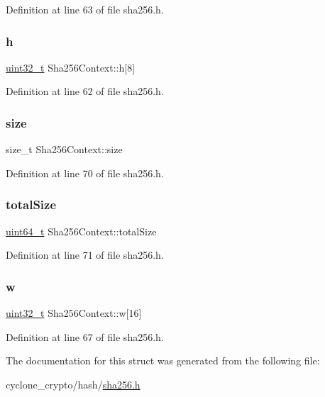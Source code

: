 Definition at line 63 of file sha256.\+h.

\mbox{\label{structSha256Context_a47e82c75a2bffa21e47cd4f7dde0e01d}} 
\subsubsection{\texorpdfstring{h}{h}}
{\footnotesize\ttfamily \hyperlink{stdint_8h_a435d1572bf3f880d55459d9805097f62}{uint32\+\_\+t} Sha256\+Context\+::h\mbox{[}8\mbox{]}}



Definition at line 62 of file sha256.\+h.

\mbox{\label{structSha256Context_aa0dd1c73bffbc7dd5e0a3ca761a2b5a5}} 
\subsubsection{\texorpdfstring{size}{size}}
{\footnotesize\ttfamily size\+\_\+t Sha256\+Context\+::size}



Definition at line 70 of file sha256.\+h.

\mbox{\label{structSha256Context_a1580160baa9a7ab6788054ce71f9e6af}} 
\subsubsection{\texorpdfstring{total\+Size}{totalSize}}
{\footnotesize\ttfamily \hyperlink{stdint_8h_aec6fcb673ff035718c238c8c9d544c47}{uint64\+\_\+t} Sha256\+Context\+::total\+Size}



Definition at line 71 of file sha256.\+h.

\mbox{\label{structSha256Context_af557ee81cdcfdd3615776b9d7dafc1c6}} 
\subsubsection{\texorpdfstring{w}{w}}
{\footnotesize\ttfamily \hyperlink{stdint_8h_a435d1572bf3f880d55459d9805097f62}{uint32\+\_\+t} Sha256\+Context\+::w\mbox{[}16\mbox{]}}



Definition at line 67 of file sha256.\+h.



The documentation for this struct was generated from the following file\+:\begin{DoxyCompactItemize}
\item 
cyclone\+\_\+crypto/hash/\hyperlink{sha256_8h}{sha256.\+h}\end{DoxyCompactItemize}
